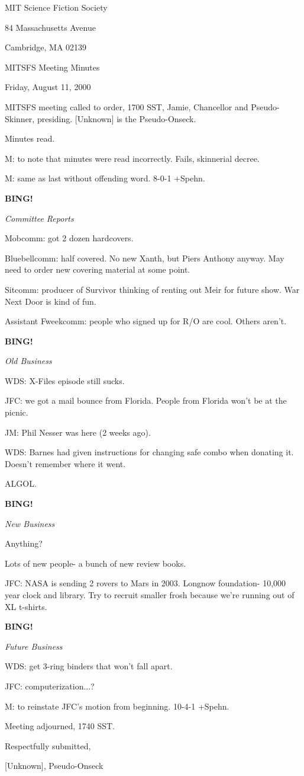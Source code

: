 \documentclass[12pt]{article}
\newcommand{\bing}{{\bf BING!} }
\newcommand{\goto}[1]{\bing \vskip 12pt \centerline{{\em{#1}}}}
\begin{document}
\begin{center}

MIT Science Fiction Society 

84 Massachusetts Avenue

Cambridge, MA 02139

\vspace{12pt}

MITSFS Meeting Minutes 

Friday, August 11, 2000

\end{center}
 
\vspace{18pt}

\setlength{\parskip}{6pt}

\noindent
MITSFS meeting called to order, 1700 SST, Jamie, Chancellor and Pseudo-Skinner, presiding. [Unknown] is the Pseudo-Onseck.

Minutes read.

M: to note that minutes were read incorrectly. Fails, skinnerial decree.

M: same as last without offending word. 8-0-1 +Spehn.

\goto{Committee Reports}

Mobcomm: got 2 dozen hardcovers.

Bluebellcomm: half covered. No new Xanth, but Piers Anthony anyway. May need to order new covering material at some point.

Sitcomm: producer of Survivor thinking of renting out Meir for future show. War Next Door is kind of fun.

Assistant Fweekcomm: people who signed up for R/O are cool. Others aren't.

\goto{Old Business}

WDS: X-Files episode still sucks.

JFC: we got a mail bounce from Florida. People from Florida won't be at the picnic.

JM: Phil Nesser was here (2 weeks ago).

WDS: Barnes had given instructions for changing safe combo when donating it. Doesn't remember where it went.

ALGOL.

\goto{New Business}

Anything?

Lots of new people- a bunch of new review books.

JFC: NASA is sending 2 rovers to Mars in 2003. Longnow foundation- 10,000 year clock and library. Try to recruit smaller frosh because we're running out of XL t-shirts.

\goto{Future Business}

WDS: get 3-ring binders that won't fall apart.

JFC: computerization...?

M: to reinstate JFC's motion from beginning. 10-4-1 +Spehn.

\vspace{12pt}

\noindent
Meeting adjourned, 1740 SST.

\vspace{18pt}

\centerline{Respectfully submitted,}
\centerline{[Unknown], Pseudo-Onseck}
\end{document}
